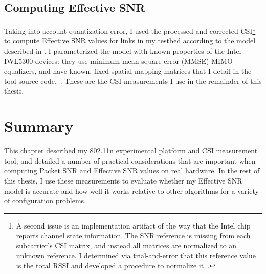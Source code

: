 \subsection{Computing Effective SNR}
Taking into account quantization error, I used the processed and corrected CSI\footnote{A second issue is an implementation artifact of the way that the Intel chip reports channel state information. The SNR reference is missing from each subcarrier's CSI matrix, and instead all matrices are normalized to an unknown reference. I determined via trial-and-error that this reference value is the total RSSI and developed a procedure to normalize it~\cite[\texttt{matlab/get\_scaled\_csi.m}]{csitool_code}.} to compute Effective SNR values for links in my testbed according to the model described in . I parameterized the model with known properties of the Intel IWL5300 devices: they use minimum mean square error (MMSE) MIMO equalizers, and have known, fixed spatial mapping matrices that I detail in the tool source code.~\cite[\texttt{matlab/sm\_matrices.m}]{csitool_code}. These are the CSI measurements I use in the remainder of this thesis.

\section{Summary}
This chapter described my 802.11n experimental platform and CSI measurement tool, and detailed a number of practical considerations that are important when computing Packet SNR and Effective SNR values on real hardware. In the rest of this thesis, I use these measurements to evaluate whether my Effective SNR model is accurate and how well it works relative to other algorithms for a variety of configuration problems.

\ifx\mainfile\undefined

\fi